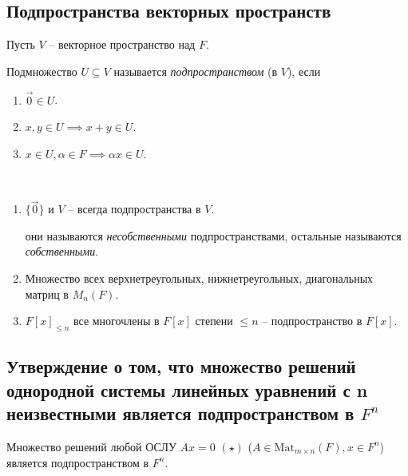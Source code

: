 \subsection{Подпространства векторных пространств}


Пусть $V$ -- векторное пространство над $F$.

\begin{definition}
    Подмножество $U \subseteq V$ называется \textit{подпространством} (в $V$), если
    \begin{enumerate}[nosep]
    \item $\overrightarrow{0} \in U$.
    \item $x, y \in U \implies x + y \in U$.
    \item $x \in U, \alpha \in F \implies \alpha x \in U$.
    \end{enumerate}
\end{definition}

\begin{comment}
    Всякое подпространство само является векторным пространством относительно тех же операций.
\end{comment}

\begin{example}~
    \begin{enumerate}
        \item $\{\overrightarrow{0}\}$ и $V$ -- всегда подпространства в $V$.

            они называются \textit{несобственными} подпространствами, остальные называются \textit{собственными}.

        \item Множество всех верхнетреугольных, нижнетреугольных, диагональных матриц в $M_n(F)$.

        \item $F[x]_{\leq n}$ все многочлены в $F[x]$ степени $\leq n$ -- подпространство в $F[x]$.
    \end{enumerate}
\end{example}


\subsection{Утверждение о том, что множество решений однородной системы линейных уравнений с n неизвестными является подпространством в $F^n$}

\begin{proposal}
    Множество решений любой ОСЛУ $Ax = 0$ $(\star)$ ($A \in \text{Mat}_{m \times n}(F), x \in F^n$) является подпространством в $F^n$.
\end{proposal}


